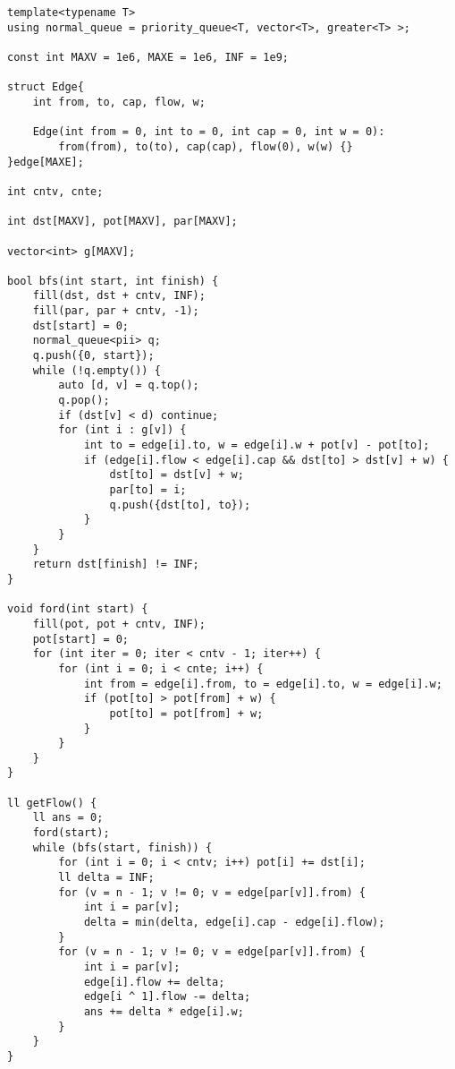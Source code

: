 \documentclass{article}
\begin{document}
    \begin{verbatim}
template<typename T>
using normal_queue = priority_queue<T, vector<T>, greater<T> >;

const int MAXV = 1e6, MAXE = 1e6, INF = 1e9;

struct Edge{
    int from, to, cap, flow, w;

    Edge(int from = 0, int to = 0, int cap = 0, int w = 0):
        from(from), to(to), cap(cap), flow(0), w(w) {}
}edge[MAXE];

int cntv, cnte;

int dst[MAXV], pot[MAXV], par[MAXV];

vector<int> g[MAXV];

bool bfs(int start, int finish) {
    fill(dst, dst + cntv, INF);
    fill(par, par + cntv, -1);
    dst[start] = 0;
    normal_queue<pii> q;
    q.push({0, start});
    while (!q.empty()) {
        auto [d, v] = q.top();
        q.pop();
        if (dst[v] < d) continue;
        for (int i : g[v]) {
            int to = edge[i].to, w = edge[i].w + pot[v] - pot[to];
            if (edge[i].flow < edge[i].cap && dst[to] > dst[v] + w) {
                dst[to] = dst[v] + w;
                par[to] = i;
                q.push({dst[to], to});
            }
        }
    }
    return dst[finish] != INF;
}

void ford(int start) {
    fill(pot, pot + cntv, INF);
    pot[start] = 0;
    for (int iter = 0; iter < cntv - 1; iter++) {
        for (int i = 0; i < cnte; i++) {
            int from = edge[i].from, to = edge[i].to, w = edge[i].w;
            if (pot[to] > pot[from] + w) {
                pot[to] = pot[from] + w;
            }
        }
    }
}

ll getFlow() {
    ll ans = 0;
    ford(start);
    while (bfs(start, finish)) {
        for (int i = 0; i < cntv; i++) pot[i] += dst[i];
        ll delta = INF;
        for (v = n - 1; v != 0; v = edge[par[v]].from) {
            int i = par[v];
            delta = min(delta, edge[i].cap - edge[i].flow);
        }
        for (v = n - 1; v != 0; v = edge[par[v]].from) {
            int i = par[v];
            edge[i].flow += delta;
            edge[i ^ 1].flow -= delta;
            ans += delta * edge[i].w;
        }
    }
}
    \end{verbatim}   
\end{document}

